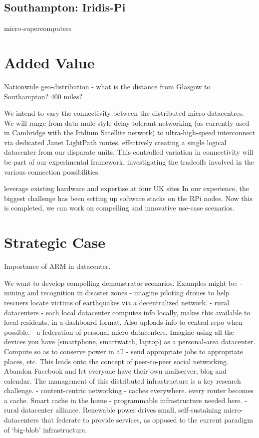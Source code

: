 \documentclass[a4paper,11pt]{article}
\begin{document}
\subsection{Southampton: Iridis-Pi}

micro-supercomputers
\cite{cox2014iridis}


\section{Added Value}


Nationwide geo-distribution - what is the distance from Glasgow to Southampton? 400 miles?

We intend to vary the connectivity between the distributed micro-datacentres. We will range from data-mule style delay-tolerant networking (as currently used in Cambridge with the Iridium Satellite network) to ultra-high-speed interconnect via dedicated Janet LightPath routes, effectively creating a single logical datacenter from our disparate units. 
This controlled variation in connectivity will be part of our experimental framework, investigating the tradeoffs involved in the various connection possibilities.

leverage existing hardware and expertise at four UK sites
In our experience, the biggest challenge has been setting up software stacks on the RPi nodes. Now this is completed, we can work on compelling and innovative use-case scenarios.





\section{Strategic Case}


Importance of ARM in datacenter.

We want to develop compelling demonstrator scenarios. Examples might be:
- mining and recognition in disaster zones - imagine piloting drones to help rescuers locate victims of earthquakes via a decentralized network.
- rural datacenters - each local datacenter computes info locally, makes this available to local residents, in a dashboard format. Also uploads info to central repo when possible.
- a federation of personal micro-datacenters. Imagine using all the devices you have (smartphone, smartwatch, laptop) as a personal-area datacenter. Compute so as to conserve power in all - send appropriate jobs to appropriate places, etc. This leads onto the concept of peer-to-peer social networking. Abandon Facebook and let everyone have their own mailserver, blog and calendar. The management of this distributed infrastructure is a key research challenge.
- content-centric networking - caches everywhere. every router becomes a cache. Smart cache in the home - programmable infrastructure needed here.
- rural datacenter alliance. Renewable power drives small, self-sustaining micro-datacenters that federate to provide services, as opposed to the current paradigm of `big-blob' infrastructure.
\end{document}

